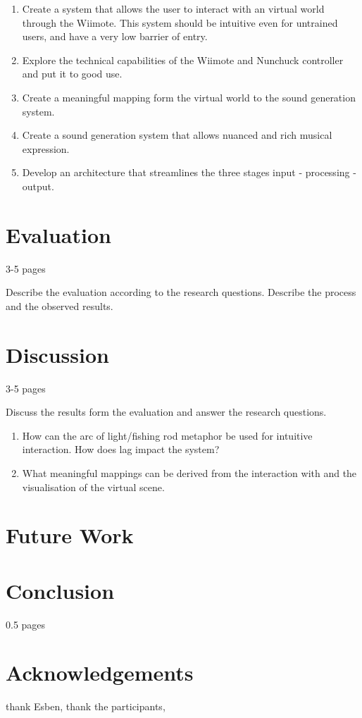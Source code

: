 \documentclass[10pt,a4paper]{scrartcl}
\begin{document}
\begin{enumerate}
\item Create a system that allows the user to interact with an virtual world through the Wiimote. This system should be intuitive even for untrained users, and have a very low barrier of entry.

\item Explore the technical capabilities of the Wiimote and Nunchuck controller and put it to good use.

\item Create a meaningful mapping form the virtual world to the sound generation system.

\item Create a sound generation system that allows nuanced and rich musical expression.
\item  Develop an architecture that streamlines the three stages input - processing - output.
\end{enumerate}

\section{Evaluation}
\label{sec:evaluation}
3-5 pages

Describe the evaluation according to the research questions. Describe the process and the observed results.


\section{Discussion}
\label{sec:discussion}
3-5 pages

Discuss the results form the evaluation and answer the research questions. 

\begin{enumerate}
\item How can the arc of light/fishing rod metaphor be used for intuitive interaction. How does lag impact the system?
\item What meaningful mappings can be derived from the interaction with and the visualisation of the virtual scene.
\end{enumerate}

\section{Future Work}

\section{Conclusion}
0.5 pages

\section{Acknowledgements}
thank Esben, thank the participants,






\end{document}
